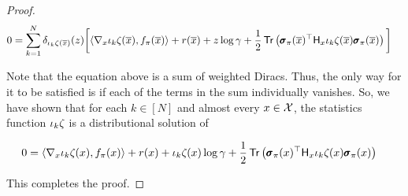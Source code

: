 \begin{proof}
  \begin{equation*}
    \begin{aligned}
      0
      &=
        \sum_{k=1}^N\dirac{\proj{k}\statistics(\overline{x})}(z)\bigg[\langle\nabla_x\proj{k}\statistics(\overline{x}),
        \xxf(\overline{x})\rangle + r(\overline{x}) + z\log\gamma
        +\frac{1}{2}\trace\left(\quadraticform{\pmb{\sigma}_\pi(\overline{x})}{\hessian{x}\proj{k}\statistics(\overline{x})}\right)\bigg]
    \end{aligned}
  \end{equation*}
    
  Note that the equation above is a sum of weighted Diracs. Thus, the
  only way for it to be satisfied is if each of the terms in the sum
  individually vanishes. So, we have shown that for each $k\in[N]$ and
  almost every $x\in\mathcal{X}$, the statistics function
  $\iota_{k}\zeta_{}$ is a distributional solution of
    
  \begin{align*}
    0 &= \langle\nabla_x\proj{k}\statistics(x), \xxf(x)\rangle + r(x)
        + \proj{k}\statistics(x)\log\gamma +
        \frac{1}{2}\trace\left(\quadraticform{\xxs(x)}{\hessian{x}\proj{k}\statistics(x)}\right)
  \end{align*}
    
  This completes the proof.
\end{proof}


